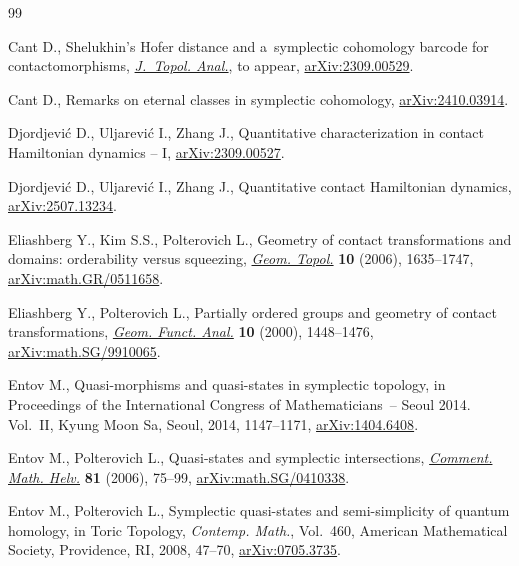 \documentclass[10pt,a4paper]{amsart}
\numberwithin{equation}{section}
\theoremstyle{definition}
\begin{document}
\begin{thebibliography}{99}
\footnotesize\itemsep=0pt

Cant D., Shelukhin's Hofer distance and a~symplectic cohomology barcode for
 contactomorphisms,
 \href{https://doi.org/10.1142/S179352532650010X}{\textit{J.~Topol. Anal.}}, {t}o appear, \href{http://arxiv.org/abs/2309.00529}{arXiv:2309.00529}.

Cant D., Remarks on eternal classes in symplectic cohomology,
 \href{http://arxiv.org/abs/2410.03914}{arXiv:2410.03914}.


Djordjevi\'c D., Uljarevi\'c I., Zhang J., Quantitative characterization in
 contact {H}amiltonian dynamics -- {I},
 \href{http://arxiv.org/abs/2309.00527}{arXiv:2309.00527}.

Djordjevi\'c D., Uljarevi\'c I., Zhang J., Quantitative contact {H}amiltonian
 dynamics, \href{http://arxiv.org/abs/2507.13234}{arXiv:2507.13234}.

Eliashberg Y., Kim S.S., Polterovich L., Geometry of contact transformations
 and domains: orderability versus squeezing,
 \href{https://doi.org/10.2140/gt.2006.10.1635}{\textit{Geom. Topol.}}
 \textbf{10} (2006), 1635--1747,
 \href{http://arxiv.org/abs/math.GR/0511658}{arXiv:math.GR/0511658}.

Eliashberg Y., Polterovich L., Partially ordered groups and geometry of contact
 transformations, \href{https://doi.org/10.1007/PL00001656}{\textit{Geom.
 Funct. Anal.}} \textbf{10} (2000), 1448--1476,
 \href{http://arxiv.org/abs/math.SG/9910065}{arXiv:math.SG/9910065}.

Entov M., Quasi-morphisms and quasi-states in symplectic topology, in
 Proceedings of the {I}nternational {C}ongress of {M}athematicians~-- {S}eoul
 2014. {V}ol.~{II}, Kyung Moon Sa, Seoul, 2014, 1147--1171,
 \href{http://arxiv.org/abs/1404.6408}{arXiv:1404.6408}.

Entov M., Polterovich L., Quasi-states and symplectic intersections,
 \href{https://doi.org/10.4171/CMH/43}{\textit{Comment. Math. Helv.}}
 \textbf{81} (2006), 75--99,
 \href{http://arxiv.org/abs/math.SG/0410338}{arXiv:math.SG/0410338}.

Entov M., Polterovich L., Symplectic quasi-states and semi-simplicity of
 quantum homology, in Toric Topology, \textit{Contemp. Math.}, Vol.~460,
American Mathematical Society,
 Providence, RI, 2008, 47--70,
 \href{http://arxiv.org/abs/0705.3735}{arXiv:0705.3735}.


\end{thebibliography}
\end{document}
